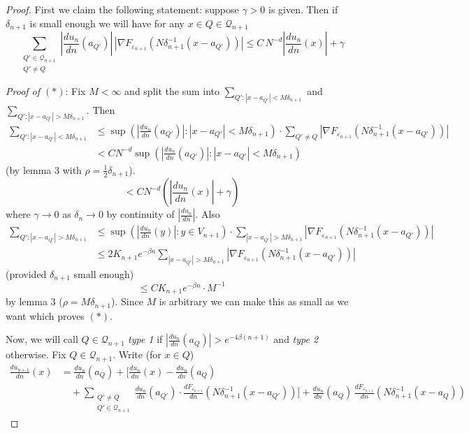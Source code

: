 \documentclass[11pt,reqno]{amsart}
\newcommand{\dn}[1]{\frac{d#1}{dn}}
\begin{document}
\begin{proof}
First we claim the following statement: suppose $\gamma>0$ is given.  Then if
$\delta_{n+1}$ is small enough we will have for any $x\in Q\in\mathcal{Q}_{n+1}$
\begin{equation}\tag{$*$}
 \sum_{\substack{Q'\in\mathcal{Q}_{n+1}\\ Q'\neq Q}}
  \left|\dn{u_n}(a_{Q'})\right|\,
  \left|\nabla F_{\varepsilon_{n+1}}(N\delta_{n+1}^{-1}(x-a_{Q'}))\right|
 \leq C\,N^{-d}\left|\dn{u_n}(x)\right|+\gamma
\end{equation}

\emph{Proof of $(*)$}: Fix $M<\infty$ and split the sum into
$\sum_{Q':|x-a_{Q'}|<M\delta_{n+1}}$ and $\sum_{Q':|x-a_{Q'}|>M\delta_{n+1}}$.
Then
\begin{align*}
 \sum_{Q':|x-a_{Q'}|<M\delta_{n+1}}
 &\leq\sup\left(\left|\dn{u_n}(a_{Q'})\right| : |x-a_{Q'}|<M\delta_{n+1}\right)
   \cdot\sum_{Q'\neq Q}\left|\nabla F_{\varepsilon_{n+1}}(N\delta_{n+1}^{-1}(x-a_{Q'}))\right|\\
 &< C N^{-d}\sup\left(\left|\dn{u_n}(a_{Q'})\right| : |x-a_{Q'}|<M\delta_{n+1}\right)
\end{align*}
(by lemma 3 with $\rho=\tfrac12\delta_{n+1}$).
\begin{equation*}
 < C N^{-d}\left(\left|\dn{u_n}(x)\right|+\gamma\right)
\end{equation*}
where $\gamma\to 0$ as $\delta_n\to 0$ by continuity of $\left|\dn{u_n}\right|$.
Also
\begin{align*}
 \sum_{Q':|x-a_{Q'}|>M\delta_{n+1}}
 &\leq\sup\left(\left|\dn{u_n}(y)\right| : y\in V_{n+1}\right)\cdot
   \sum_{|x-a_{Q'}|>M\delta_{n+1}}
   \left|\nabla F_{\varepsilon_{n+1}}(N\delta_{n+1}^{-1}(x-a_{Q'}))\right|\\
 &\leq 2K_{n+1}e^{-\beta n}\sum_{|x-a_{Q'}|>M\delta_{n+1}}
   \left|\nabla F_{\varepsilon_{n+1}}(N\delta_{n+1}^{-1}(x-a_{Q'}))\right|
\end{align*}
(provided $\delta_{n+1}$ small enough)
\begin{equation*}
 \leq C K_{n+1}e^{-\beta n}\cdot M^{-1}
\end{equation*}
by lemma 3 ($\rho=M\delta_{n+1}$).  Since $M$ is arbitrary we can make this as
small as we want which proves $(*)$.

Now, we will call $Q\in\mathcal{Q}_{n+1}$ \emph{type 1} if
$\left|\dn{u_n}(a_Q)\right|>e^{-4\beta(n+1)}$ and \emph{type 2} otherwise.
Fix $Q\in\mathcal{Q}_{n+1}$.  Write (for $x\in Q$)
\begin{align*}
 \dn{u_{n+1}}(x)&=\dn{u_n}(a_Q)+\Big[\dn{u_n}(x)-\dn{u_n}(a_Q)\\
 &\quad+\sum_{\substack{Q'\neq Q\\ Q'\in\mathcal{Q}_{n+1}}}\dn{u_n}(a_{Q'})\cdot
   \dn{F_{\varepsilon_{n+1}}}(N\delta_{n+1}^{-1}(x-a_{Q'}))\Big]
   +\dn{u_n}(a_Q)\,\dn{F_{\varepsilon_{n+1}}}(N\delta_{n+1}^{-1}(x-a_Q))
\end{align*}


\end{proof}
\end{document}
